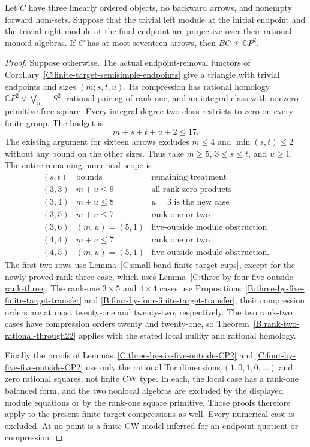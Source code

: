 \begin{theorem}
\label{C:semisimple-endpoints-seventeen}
Let $C$ have three linearly ordered objects, no backward arrows,
and nonempty forward hom-sets.  Suppose that the trivial left
module at the initial endpoint and the trivial right module at
the final endpoint are projective over their rational monoid
algebras.  If $C$ has at most seventeen arrows, then
$BC\not\simeq\mathbb CP^2$.
\end{theorem}
\begin{proof}
Suppose otherwise.  The actual endpoint-removal functors of
Corollary~\ref{C:finite-target-semisimple-endpoints} give a
triangle with trivial endpoints and sizes $(m;s,t,u)$.
Its compression has rational homology
$\mathbb CP^2\vee\bigvee_{u-1}S^2$, rational pairing of
rank one, and an integral class with nonzero primitive free
square.  Every integral degree-two class restricts to zero
on every finite group.  The budget is
\[
 m+s+t+u+2\leq17.
\]
The existing argument for sixteen arrows excludes $m\leq4$
and $\min(s,t)\leq2$ without any bound on the other sizes.
Thus take $m\geq5$, $3\leq s\leq t$, and $u\geq1$.
The entire remaining numerical scope is
\[
\begin{array}{c|c|c}
 (s,t)&\text{bounds}&\text{remaining treatment}\\\hline
 (3,3)&m+u\leq9&\text{all-rank zero products}\\
 (3,4)&m+u\leq8&u=3\text{ is the new case}\\
 (3,5)&m+u\leq7&\text{rank one or two}\\
 (3,6)&(m,u)=(5,1)&\text{five-outside module obstruction}\\
 (4,4)&m+u\leq7&\text{rank one or two}\\
 (4,5)&(m,u)=(5,1)&\text{five-outside module obstruction}.
\end{array}
\]
The first two rows use Lemma~\ref{C:small-band-finite-target-cups},
except for the newly proved rank-three case, which uses
Lemma~\ref{C:three-by-four-five-outside-rank-three}.
The rank-one $3\times5$ and $4\times4$ cases use
Propositions~\ref{B:three-by-five-finite-target-transfer} and
\ref{B:four-by-four-finite-target-transfer}; their compression
orders are at most twenty-one and twenty-two, respectively.
The two rank-two cases have compression orders twenty and
twenty-one, so Theorem~\ref{B:rank-two-rational-through22}
applies with the stated local nullity and rational homology.

Finally the proofs of
Lemmas~\ref{C:three-by-six-five-outside-CP2} and
\ref{C:four-by-five-five-outside-CP2} use only the rational
Tor dimensions $(1,0,1,0,\ldots)$ and zero rational squares,
not finite CW type.  In each, the local case has a rank-one
balanced form, and the two nonlocal algebras are excluded by
the displayed module equations or by the rank-one square
primitive.  Those proofs therefore apply to the present
finite-target compressions as well.
Every numerical case is excluded.  At no point is a finite
CW model inferred for an endpoint quotient or compression.
\end{proof}
